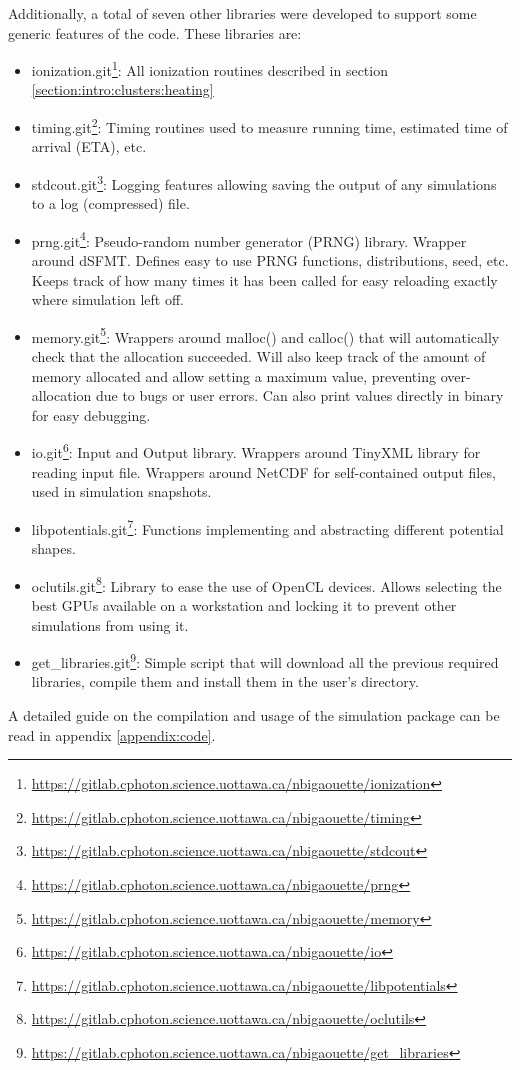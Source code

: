 Additionally, a total of seven other libraries were developed to support some
generic features of the code. These libraries are:
\begin{itemize}
\item ionization.git\footnote{ \url{
    https://gitlab.cphoton.science.uottawa.ca/nbigaouette/ionization}}:
    All ionization routines described in section
    \ref{section:intro:clusters:heating}
\item timing.git\footnote{ \url{
    https://gitlab.cphoton.science.uottawa.ca/nbigaouette/timing}}:
    Timing routines used to measure running time, estimated time of arrival
(ETA), etc.
\item stdcout.git\footnote{ \url{
    https://gitlab.cphoton.science.uottawa.ca/nbigaouette/stdcout}}:
    Logging features allowing saving the output of any simulations to a log
    (compressed) file.
\item prng.git\footnote{ \url{
    https://gitlab.cphoton.science.uottawa.ca/nbigaouette/prng}}:
    Pseudo-random number generator (PRNG) library. Wrapper around
dSFMT\cite{prng2009}. Defines easy to use PRNG functions, distributions, seed,
etc. Keeps track of how many times it has been called for easy reloading
exactly where simulation left off.
\item memory.git\footnote{ \url{
    https://gitlab.cphoton.science.uottawa.ca/nbigaouette/memory}}:
    Wrappers around malloc() and calloc() that will automatically check that
    the allocation succeeded. Will also keep track of the amount of
    memory allocated and allow setting a maximum value, preventing
    over-allocation due to bugs or user errors. Can also print values directly
    in binary for easy debugging.
\item io.git\footnote{ \url{
    https://gitlab.cphoton.science.uottawa.ca/nbigaouette/io}}:
    Input and Output library. Wrappers around TinyXML library\cite{tinyxml} for
reading input file. Wrappers around NetCDF\cite{netcdf} for self-contained
output files, used in simulation snapshots.
\item libpotentials.git\footnote{ \url{
    https://gitlab.cphoton.science.uottawa.ca/nbigaouette/libpotentials}}:
    Functions implementing and abstracting different potential shapes.
\item oclutils.git\footnote{ \url{
    https://gitlab.cphoton.science.uottawa.ca/nbigaouette/oclutils}}:
    Library to ease the use of OpenCL devices. Allows selecting the best GPUs
    available on a workstation and locking it to prevent other simulations from
    using it.
\item get\_libraries.git\footnote{ \url{
    https://gitlab.cphoton.science.uottawa.ca/nbigaouette/get_libraries}}:
    Simple script that will download all the previous required libraries,
    compile them and install them in the user's directory.
\end{itemize}
A detailed guide on the compilation and usage of the simulation package can be
read in appendix \ref{appendix:code}.


